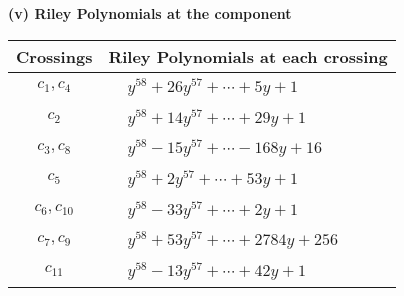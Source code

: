 \documentclass[1p]{elsarticle_modified}
\theoremstyle{definition}
\begin{document}
\newpage\renewcommand{\arraystretch}{1}
\flushleft \textbf{(v) Riley Polynomials at the component}\newline \\
\begin{tabular}{m{50pt}|m{274pt}}
Crossings & \hspace{64pt}Riley Polynomials at each crossing \\
\hline $$\begin{aligned}c_{1},c_{4}\end{aligned}$$&$\begin{aligned}
&y^{58}+26 y^{57}+\cdots+5 y+1
\end{aligned}$\\
\hline $$\begin{aligned}c_{2}\end{aligned}$$&$\begin{aligned}
&y^{58}+14 y^{57}+\cdots+29 y+1
\end{aligned}$\\
\hline $$\begin{aligned}c_{3},c_{8}\end{aligned}$$&$\begin{aligned}
&y^{58}-15 y^{57}+\cdots-168 y+16
\end{aligned}$\\
\hline $$\begin{aligned}c_{5}\end{aligned}$$&$\begin{aligned}
&y^{58}+2 y^{57}+\cdots+53 y+1
\end{aligned}$\\
\hline $$\begin{aligned}c_{6},c_{10}\end{aligned}$$&$\begin{aligned}
&y^{58}-33 y^{57}+\cdots+2 y+1
\end{aligned}$\\
\hline $$\begin{aligned}c_{7},c_{9}\end{aligned}$$&$\begin{aligned}
&y^{58}+53 y^{57}+\cdots+2784 y+256
\end{aligned}$\\
\hline $$\begin{aligned}c_{11}\end{aligned}$$&$\begin{aligned}
&y^{58}-13 y^{57}+\cdots+42 y+1
\end{aligned}$\\
\hline
\end{tabular}\\~\\
\end{document}
